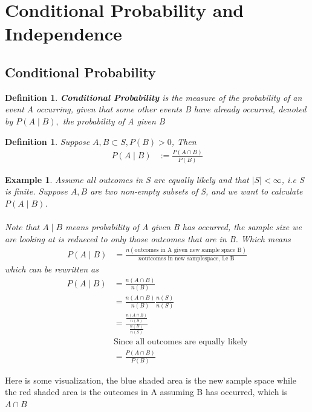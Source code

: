 \documentclass[11pt,oneside]{book}
\theoremstyle{newStyle}
\newtheorem{defn}[thm]{Definition}
\newtheorem{ex}{Example}[section]
\begin{document}
\section[Conditional Probability and Independence]{Conditional Probability and Independence}
\subsection[Conditional Probability]{Conditional Probability}
\begin{defn}
\textbf{Conditional Probability} is the measure of the probability of an event A occurring, given that some other events B have already occurred, denoted by $P(A\mid B),$ the probability of A given B
\end{defn}
\begin{defn}
Suppose $A,B\subset S,P(B)>0$, Then \begin{align*}
P(A\mid B)&:=\frac{P(A\cap B)}{P(B)}
\end{align*}
\end{defn}
\begin{ex}
Assume all outcomes in S are equally likely and that $|S|<\infty$, i.e S is finite. Suppose $A,B$ are two non-empty subsets of S, and we want to calculate $P(A\mid B)$.\\
\hfill\\
Note that $A\mid B$ means probability of A given B has occurred, the sample size we are looking at is redueced to only those outcomes that are in B. Which means \begin{align*}
P(A\mid B)&=\frac{n(\text{outcomes in A given new sample space B})}{n\text{outcomes in new samplespace, i.e B}}
\end{align*}
which can be rewritten as \begin{align*}
P(A\mid B)&=\frac{n(A\cap B)}{n(B)}\\
&=\frac{n(A\cap B)}{n(B)} \frac{n(S)}{n(S)}\\
&=\frac{\frac{n(A\cap B)}{n(S)}}{\frac{n(B)}{n(S)}} \\
&\text{Since all outcomes are equally likely}\\
&=\frac{P(A\cap B)}{P(B)}
\end{align*}
\end{ex}
Here is some visualization, the blue shaded area is the new sample space while the red shaded area is the outcomes in A assuming B has occurred, which is $A\cap B$\\
\end{document}
